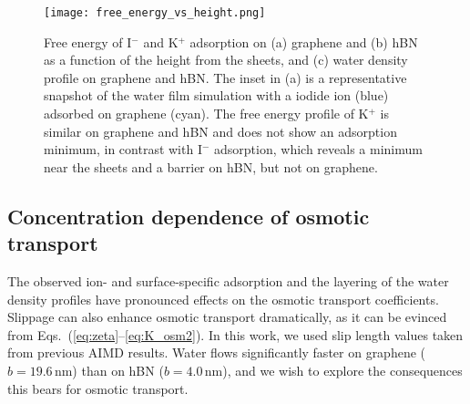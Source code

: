 \documentclass[journal=ancac3,manuscript=article,layout=twocolumn]{achemso}
\begin{document}
\begin{figure}
\texttt{[image: free\_energy\_vs\_height.png]}
\caption{\label{fig:free_energy}
Free energy of I$^-$ and K$^+$ adsorption
on (a) graphene and (b) hBN as a function of the height from the sheets,
and (c) water density profile on graphene and hBN.
The inset in (a) is a representative snapshot
of the water film simulation with a
iodide ion (blue) adsorbed on graphene (cyan).
The free energy profile of K$^+$
is similar on graphene and hBN and
does not show an adsorption minimum, in contrast with I$^-$ adsorption, which
reveals a minimum near the sheets
and a barrier on hBN, but not on graphene.}
\end{figure}



\subsection{Concentration dependence of osmotic transport}
The observed ion- and surface-specific
adsorption and the layering  of the water density
profiles have pronounced effects
on the osmotic transport coefficients.
Slippage can also enhance osmotic
transport dramatically\cite{Ajdari2006}, as it can be
evinced from Eqs.~(\ref{eq:zeta}--\ref{eq:K_osm2}).
In this work, we used slip length values
taken from previous AIMD results\cite{tocci2020nanoscale}.
Water flows significantly faster
on graphene ($b=19.6$\,nm) than on hBN ($b=4.0$\,nm),
and we wish to explore the consequences this
bears for osmotic transport.
\end{document}
